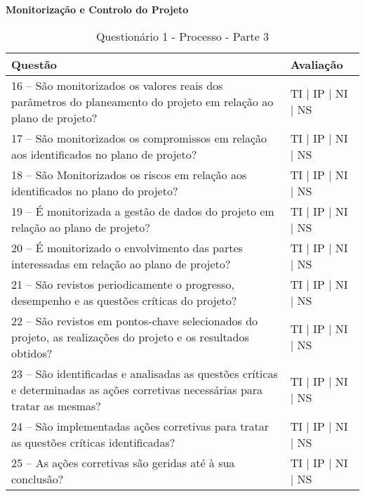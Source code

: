 \documentclass[openany,10pt,a4paper]{article}
\begin{document}
\begin{longtable}
\begin{appendix}
\begin{table}[h]
\textbf{Monitorização e Controlo do Projeto}
	\centering
	\caption{Questionário 1 - Processo - Parte 3}
	\begin{tabular}{p{3.5in}p{2in}}		
		\toprule
		\textbf{Questão}  & \textbf{Avaliação}\\ 
		\midrule
		16 – São monitorizados os valores reais dos parâmetros do planeamento do projeto em relação 
ao plano de projeto? 
 & TI | IP | NI | NS \\
        \midrule
		17 – São monitorizados os compromissos em relação aos identificados no plano de projeto?
 & TI | IP | NI | NS \\
		\midrule
		18 – São Monitorizados os riscos em relação aos identificados no plano do projeto?
 & TI | IP | NI | NS \\
		\midrule
        19 – É monitorizada a gestão de dados do projeto em relação ao plano de projeto?
 & TI | IP | NI | NS \\
		\midrule
		20 – É monitorizado o envolvimento das partes interessadas em relação ao plano de projeto?
  & TI | IP | NI | NS \\
		\midrule
		21 – São revistos periodicamente o progresso, desempenho e as questões críticas do projeto?
 & TI | IP | NI | NS \\
		\midrule
		22 – São revistos em pontos-chave selecionados do projeto, as realizações do projeto e os 
resultados obtidos?
 & TI | IP | NI | NS \\
        \midrule
        23 – São identificadas e analisadas as questões críticas e determinadas as ações corretivas 
necessárias para tratar as mesmas?
 & TI | IP | NI | NS \\
		\midrule
		24 – São implementadas ações corretivas para tratar as questões críticas identificadas?
 & TI | IP | NI | NS \\
		\midrule
		25 – As ações corretivas são geridas até à sua conclusão?
 & TI | IP | NI | NS \\
		\bottomrule
	\end{tabular} 
	\label{tab:tabela1}
\end{table}


\end{appendix}
\end{longtable}
\end{document}
